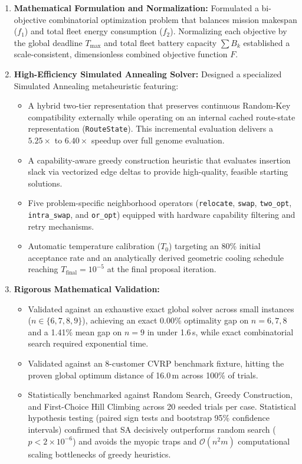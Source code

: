 \begin{enumerate}
    \item \textbf{Mathematical Formulation and Normalization:} Formulated a bi-objective combinatorial optimization problem that balances mission makespan ($f_1$) and total fleet energy consumption ($f_2$). Normalizing each objective by the global deadline $T_{\max}$ and total fleet battery capacity $\sum B_k$ established a scale-consistent, dimensionless combined objective function $F$.
    \item \textbf{High-Efficiency Simulated Annealing Solver:} Designed a specialized Simulated Annealing metaheuristic featuring:
    \begin{itemize}
        \item A hybrid two-tier representation that preserves continuous Random-Key compatibility externally while operating on an internal cached route-state representation (\texttt{RouteState}). This incremental evaluation delivers a $5.25\times$ to $6.40\times$ speedup over full genome evaluation.
        \item A capability-aware greedy construction heuristic that evaluates insertion slack via vectorized edge deltas to provide high-quality, feasible starting solutions.
        \item Five problem-specific neighborhood operators (\texttt{relocate}, \texttt{swap}, \texttt{two\_opt}, \texttt{intra\_swap}, and \texttt{or\_opt}) equipped with hardware capability filtering and retry mechanisms.
        \item Automatic temperature calibration ($T_0$) targeting an 80\% initial acceptance rate and an analytically derived geometric cooling schedule reaching $T_{\text{final}} = 10^{-5}$ at the final proposal iteration.
    \end{itemize}
    \item \textbf{Rigorous Mathematical Validation:}
    \begin{itemize}
        \item Validated against an exhaustive exact global solver across small instances ($n \in \{6, 7, 8, 9\}$), achieving an exact 0.00\% optimality gap on $n=6,7,8$ and a 1.41\% mean gap on $n=9$ in under 1.6\,s, while exact combinatorial search required exponential time.
        \item Validated against an 8-customer \ac{CVRP} benchmark fixture, hitting the proven global optimum distance of 16.0\,m across 100\% of trials.
        \item Statistically benchmarked against Random Search, Greedy Construction, and First-Choice Hill Climbing across 20 seeded trials per case. Statistical hypothesis testing (paired sign tests and bootstrap 95\% confidence intervals) confirmed that SA decisively outperforms random search ($p < 2 \times 10^{-6}$) and avoids the myopic traps and $\mathcal{O}(n^2 m)$ computational scaling bottlenecks of greedy heuristics.

\end{itemize}
\end{enumerate}
